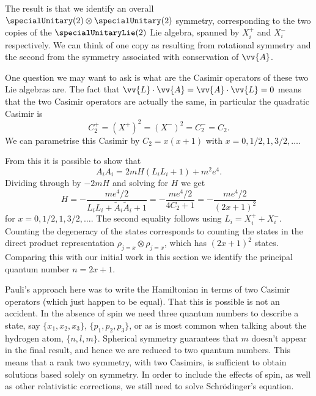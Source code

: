 \documentclass[fleqn]{NotesClass}
\newcommand*{\directproduct}{\otimes}
\begin{document}
    The result is that we identify an overall \(\specialUnitary(2) \directproduct \specialUnitary(2)\) symmetry, corresponding to the two copies of the \(\specialUnitaryLie(2)\) Lie algebra, spanned by \(X_i^+\) and \(X_i^-\) respectively.
    We can think of one copy as resulting from rotational symmetry and the second from the symmetry associated with conservation of \(\vv{A}\).
    
    One question we may want to ask is what are the Casimir operators of these two Lie algebras are.
    The fact that \(\vv{L} \cdot \vv{A} = \vv{A} \cdot \vv{L} = 0\) means that the two Casimir operators are actually the same, in particular the quadratic Casimir is
    \begin{equation}
        C_2^+ = (X^+)^2 = (X^-)^2 = C_2^- = C_2.
    \end{equation}
    We can parametrise this Casimir by \(C_2 = x(x + 1)\) with \(x = 0, 1/2, 1, 3/2, \dotsc\).
    
    From this it is possible to show that
    \begin{equation}
        A_iA_i = 2mH(L_iL_i + 1) + m^2e^4.
    \end{equation}
    Dividing through by \(-2mH\) and solving for \(H\) we get
    \begin{equation}
        H = -\frac{me^4/2}{L_iL_i + \tilde{A}_i\tilde{A}_i + 1} = -\frac{me^4/2}{4C_2 + 1} = -\frac{me^4/2}{(2x + 1)^2}
    \end{equation}
    for \(x = 0, 1/2, 1, 3/2, \dotsc\).
    The second equality follows using \(L_i = X_i^+ + X_i^-\).
    Counting the degeneracy of the states corresponds to counting the states in the direct product representation \(\rho_{j = x} \directproduct \rho_{j = x}\), which has \((2x + 1)^2\) states.
    Comparing this with our initial work in this section we identify the principal quantum number \(n = 2x + 1\).
    
    Pauli's approach here was to write the Hamiltonian in terms of two Casimir operators (which just happen to be equal).
    That this is possible is not an accident.
    In the absence of spin we need three quantum numbers to describe a state, say \(\{x_1, x_2, x_3\}\), \(\{p_1, p_2, p_3\}\), or as is most common when talking about the hydrogen atom, \(\{n, l, m\}\).
    Spherical symmetry guarantees that \(m\) doesn't appear in the final result, and hence we are reduced to two quantum numbers.
    This means that a rank two symmetry, with two Casimirs, is sufficient to obtain solutions based solely on symmetry.
    In order to include the effects of spin, as well as other relativistic corrections, we still need to solve Schrödinger's equation.
    
    
    \appendixpage
    \begin{appendices}
        
        
        
        
    \end{appendices}
    
    \backmatter
    \renewcommand{\glossaryname}{Acronyms}
    \printglossary[acronym]
    \printindex
\end{document}

